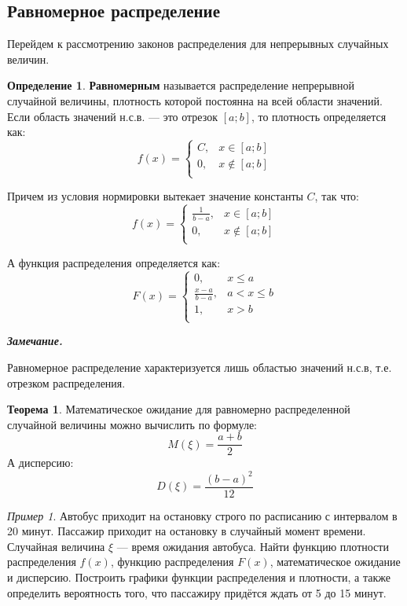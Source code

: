 \documentclass[12pt,a4paper]{article}
\theoremstyle{definition}
\newtheorem{definition}{Определение}[section]
\theoremstyle{definition}
\newtheorem{theorem}{Теорема}[section]
\theoremstyle{remark}
\newenvironment{remark}{
  \par\noindent\textbf{\textit{Замечание.}}~
}{\par}
\theoremstyle{corollary}
\theoremstyle{bolditalic}
\newtheorem{example}{Пример}[section]
\begin{document}
\subsection{Равномерное распределение}

Перейдем к рассмотрению законов распределения для непрерывных случайных величин.

\begin{definition}
    \textbf{Равномерным} называется распределение непрерывной случайной величины, плотность которой постоянна на всей области значений.\\

    Если область значений н.с.в. --- это отрезок $[a;b]$, то плотность определяется как:
    \[
    f(x) = \begin{cases}
      C, & x \in [a;b] \\
      0, & x \notin [a;b] \\
    \end{cases}
    \]

    Причем из условия нормировки вытекает значение константы $C$, так что:
    \[
    f(x) = \begin{cases}
      \frac{1}{b-a}, & x \in [a;b] \\
      0, & x \notin [a;b] \\
    \end{cases}
    \]

    А функция распределения определяется как:
    \[
    F(x) = \begin{cases}
    0, & x \le a \\
      \frac{x-a}{b-a}, & a < x \le b \\
      1, & x > b \\
    \end{cases}
    \]
\end{definition}

\begin{remark}
 Равномерное распределение характеризуется лишь областью значений н.с.в, т.е. отрезком распределения.
\end{remark}

\begin{theorem}
     Математическое ожидание для равномерно распределенной случайной величины можно вычислить по формуле:
     \[
     M(\xi)=\frac{a+b}{2}
     \]
     А дисперсию:
      \[
      D(\xi)=\frac{(b-a)^2}{12}
      \]
 \end{theorem}

 \begin{example}
    Автобус приходит на остановку строго по расписанию с интервалом в 20 минут. Пассажир приходит на остановку в случайный момент времени. Случайная величина $\xi$ — время ожидания автобуса. Найти функцию плотности распределения $f(x)$, функцию распределения $F(x)$, математическое ожидание и дисперсию. Построить графики функции распределения и плотности, а также определить вероятность того, что пассажиру придётся ждать от 5 до 15 минут.
\end{example}
\end{document}
